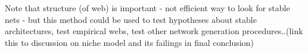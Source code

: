 Note that structure (of web) is important - not efficient way to look for stable nets - but this method could be used to test hypotheses about stable architectures, test empirical webs, test other network generation procedures..(link this to discussion on niche model and its failings in final conclusion)

%
%
%
%




